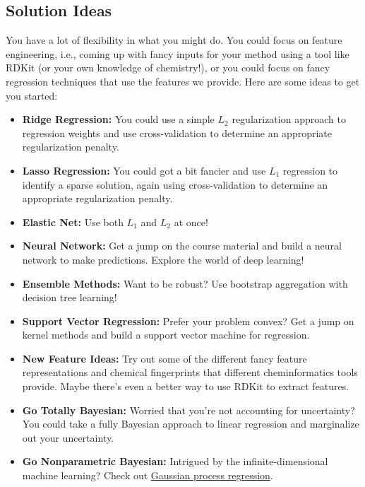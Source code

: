 \documentclass[12pt]{article}
\begin{document}
	\subsection*{Solution Ideas}  You have a lot of flexibility in what you might do.  You could focus on feature engineering, i.e., coming up with fancy inputs for your method using a tool like RDKit (or your own knowledge of chemistry!), or you could focus on fancy regression techniques that use the features we provide.  Here are some ideas to get you started:
	\begin{itemize}
		
		\item \textbf{Ridge Regression:} You could use a simple $L_2$ regularization approach to regression weights and use cross-validation to determine an appropriate regularization penalty.
		\item \textbf{Lasso Regression:} You could got a bit fancier and use $L_1$ regression to identify a sparse solution, again using cross-validation to determine an appropriate regularization penalty.
		\item \textbf{Elastic Net:} Use both $L_1$ and $L_2$ at once!
		\item \textbf{Neural Network:} Get a jump on the course material and build a neural network to make predictions.  Explore the world of deep learning!
		\item \textbf{Ensemble Methods:}
		Want to be robust?  Use bootstrap aggregation with decision tree learning! 
		\item \textbf{Support Vector Regression:} Prefer your problem convex? Get a jump on kernel methods and build a support vector machine for regression.
		\item \textbf{New Feature Ideas:} Try out some of the different fancy feature representations and chemical fingerprints that different cheminformatics tools provide.  Maybe there's even a better way to use RDKit to extract features.
		\item \textbf{Go Totally Bayesian:} Worried that you're not accounting for uncertainty?  You could take a fully Bayesian approach to linear regression and marginalize out your uncertainty.
		\item \textbf{Go Nonparametric Bayesian:} Intrigued by the infinite-dimensional machine learning?  Check out \href{http://www.gaussianprocess.org/gpml/}{Gaussian process regression}.
		
	\end{itemize}
	
	
	
\end{document}
